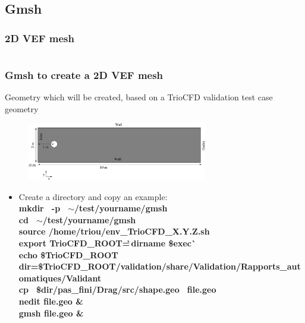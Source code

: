 \documentclass[10pt]{beamer}
\begin{document}
\subsection{Gmsh}
\subsubsection{2D VEF mesh}
\begin{frame}
\begin{columns}[c] 
\tableofcontents[sections={1-7},currentsection, currentsubsection]
\tableofcontents[sections={8-13},currentsection, currentsubsection]
\end{columns}
\end{frame}
\begin{frame}
\frametitle{Gmsh to create a 2D VEF mesh}
\begin{block}{Geometry which will be created, based on a TrioCFD validation test case geometry}

\begin{figure}
\includegraphics[width=0.7\textwidth]{PICTURES/gmsh.pdf}
\end{figure}

\begin{itemize}
\item Create a directory and copy an example:\\
{\footnotesize{
\textbf{mkdir \, -p \, $\sim$/test/yourname/gmsh} \\
\textbf{cd \, $\sim$/test/yourname/gmsh} \\
\textbf{source /home/triou/env\_TrioCFD\_X.Y.Z.sh }\\
\textbf{export TrioCFD\_ROOT=\`\,dirname \$exec\`} \\
\textbf{echo \$TrioCFD\_ROOT} \\
\textbf{dir=\$TrioCFD\_ROOT/validation/share/Validation/Rapports\_automatiques/Validant} \\
\textbf{cp \, \$dir/pas\_fini/Drag/src/shape.geo \, file.geo} \\
\textbf{nedit file.geo \& } \\
\textbf{gmsh file.geo \&} }}\\
\end{itemize}

\end{block}
\end{frame}
\end{document}
